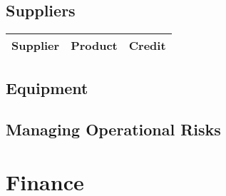 \documentclass[DIV=calc, paper=a4, fontsize=11pt]{scrartcl}	 %
\begin{document}
\subsection{Suppliers}
\begin{tabular}{|l|l|l|} \hline
Supplier & Product & Credit \\ \hline
\end{tabular}

\subsection{Equipment}

\subsection{Managing Operational Risks}

\section{Finance}
\end{document}
